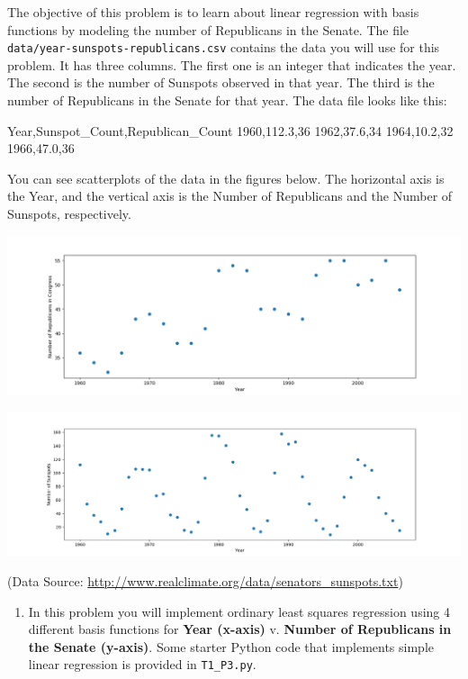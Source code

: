 \documentclass[submit]{harvardml}
\begin{document}

\begin{problem}
  
 The objective of this problem is to learn about linear regression
 with basis functions by modeling the number of Republicans in the
 Senate. The file \verb|data/year-sunspots-republicans.csv| contains the
 data you will use for this problem.  It has three columns.  The first
 one is an integer that indicates the year.  The second is the number
 of Sunspots observed in that year.  The third is the number of Republicans in the Senate for that year.
 The data file looks like this:
 \begin{csv}
Year,Sunspot_Count,Republican_Count
1960,112.3,36
1962,37.6,34
1964,10.2,32
1966,47.0,36
\end{csv}

You can see scatterplots of the data in the figures below.  The horizontal axis is the Year, and the vertical axis is the Number of Republicans and the Number of Sunspots, respectively.

\begin{center}
\includegraphics[width=.5\textwidth]{data/year-republicans}
\end{center}

\begin{center}
\includegraphics[width=.5\textwidth]{data/year-sunspots}
\end{center}

(Data Source: \url{http://www.realclimate.org/data/senators_sunspots.txt})\\
\vspace{-5mm}

\begin{enumerate}

\item In this problem you will implement ordinary least squares regression using 4 different basis functions for
\textbf{Year (x-axis)} v. \textbf{Number of Republicans in the Senate (y-axis)}. Some starter Python code
that implements simple linear regression is provided in \verb|T1_P3.py|.


\end{enumerate}
\end{problem}
\end{document}
